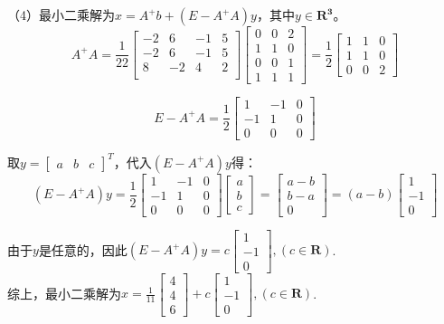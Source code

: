 \documentclass[11pt, a4paper]{article}
\begin{document}
（4）最小二乘解为$x=A^+b+(E-A^+A)y$，其中$y\in \mathbf{R^3}$。
$$A^+A=\displaystyle\frac{1}{22}
\begin{bmatrix}
-2&6&-1&5\\
-2&6&-1&5\\
8&-2&4&2\\
\end{bmatrix}
\begin{bmatrix} 0 & 0 & 2 \\ 1 & 1 & 0 \\ 0 & 0 & 1 \\ 1 & 1 & 1 \end{bmatrix}
=\displaystyle\frac{1}{2}
\begin{bmatrix} 1 & 1 & 0 \\1 & 1 &0\\0 & 0 &2 \end{bmatrix} 
$$

$$E-A^+A=\displaystyle\frac{1}{2}
\begin{bmatrix} 1 & -1 & 0\\ -1 & 1 &0\\0 & 0 & 0 \end{bmatrix} $$

取$y = \begin{bmatrix} a & b & c \end{bmatrix}^T$，代入$(E-A^+A)y$得：
$$(E-A^+A)y=\displaystyle\frac{1}{2}
\begin{bmatrix} 1 & -1 & 0\\ -1 & 1 &0\\0 & 0 & 0 \end{bmatrix}\begin{bmatrix} a \\ b \\ c \end{bmatrix}=
\begin{bmatrix} a-b \\ b-a \\ 0 \end{bmatrix}
=(a-b)\begin{bmatrix} 1 \\ -1 \\ 0 \end{bmatrix}
$$

由于$y$是任意的，因此$(E-A^+A)y=c\begin{bmatrix} 1 \\ -1 \\ 0 \end{bmatrix},(c\in \mathbf{R})$.\\

综上，最小二乘解为$x=\displaystyle\frac{1}{11}
\begin{bmatrix}4\\4\\6\end{bmatrix}+c\begin{bmatrix} 1 \\ -1 \\ 0 \end{bmatrix},(c\in \mathbf{R})$.
\end{document}
